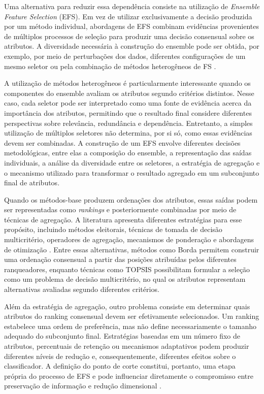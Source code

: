 Uma alternativa para reduzir essa dependência consiste na utilização de \textit{Ensemble Feature Selection} (EFS). Em vez de utilizar exclusivamente a decisão produzida por um método individual, abordagens de EFS combinam evidências provenientes de múltiplos processos de seleção para produzir uma decisão consensual sobre os atributos. A diversidade necessária à construção do ensemble pode ser obtida, por exemplo, por meio de perturbações dos dados, diferentes configurações de um mesmo seletor ou pela combinação de métodos heterogêneos de FS \cite{bolon2018scalability,mera2021framework}.

A utilização de métodos heterogêneos é particularmente interessante quando os componentes do ensemble avaliam os atributos segundo critérios distintos. Nesse caso, cada seletor pode ser interpretado como uma fonte de evidência acerca da importância dos atributos, permitindo que o resultado final considere diferentes perspectivas sobre relevância, redundância e dependência. Entretanto, a simples utilização de múltiplos seletores não determina, por si só, como essas evidências devem ser combinadas. A construção de um EFS envolve diferentes decisões metodológicas, entre elas a composição do ensemble, a representação das saídas individuais, a análise da diversidade entre os seletores, a estratégia de agregação e o mecanismo utilizado para transformar o resultado agregado em um subconjunto final de atributos.

Quando os métodos-base produzem ordenações dos atributos, essas saídas podem ser representadas como \textit{rankings} e posteriormente combinadas por meio de técnicas de agregação. A literatura apresenta diferentes estratégias para esse propósito, incluindo métodos eleitorais, técnicas de tomada de decisão multicritério, operadores de agregação, mecanismos de ponderação e abordagens de otimização \cite{drotar2019ensemble,hashemi2021pareto,abellana2022ensemble,kaur2023mcdm,abasabadi2021automatic}. Entre essas alternativas, métodos como Borda permitem construir uma ordenação consensual a partir das posições atribuídas pelos diferentes ranqueadores, enquanto técnicas como TOPSIS possibilitam formular a seleção como um problema de decisão multicritério, no qual os atributos representam alternativas avaliadas segundo diferentes critérios.

Além da estratégia de agregação, outro problema consiste em determinar quais atributos do ranking consensual devem ser efetivamente selecionados. Um ranking estabelece uma ordem de preferência, mas não define necessariamente o tamanho adequado do subconjunto final. Estratégias baseadas em um número fixo de atributos, percentuais de retenção ou mecanismos adaptativos podem produzir diferentes níveis de redução e, consequentemente, diferentes efeitos sobre o classificador. A definição do ponto de corte constitui, portanto, uma etapa própria do processo de EFS e pode influenciar diretamente o compromisso entre preservação de informação e redução dimensional \cite{seijopardo2019automatic}.

